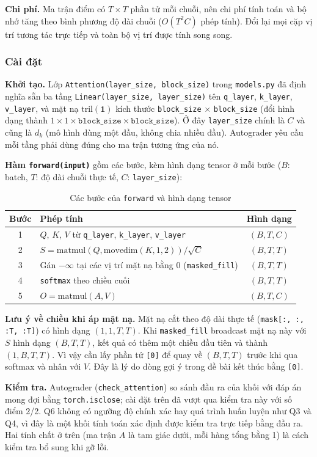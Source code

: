 \textbf{Chi phí.} Ma trận điểm có $T \times T$ phần tử mỗi chuỗi, nên chi phí tính
toán và bộ nhớ tăng theo bình phương độ dài chuỗi ($O(T^2 C)$ phép tính). Đổi lại
mọi cặp vị trí tương tác trực tiếp và toàn bộ vị trí được tính song song.

\subsubsection{Cài đặt}

\textbf{Khởi tạo.} Lớp \texttt{Attention(layer\_size, block\_size)} trong
\texttt{models.py} đã định nghĩa sẵn ba tầng \texttt{Linear(layer\_size,
layer\_size)} tên \texttt{q\_layer}, \texttt{k\_layer}, \texttt{v\_layer}, và mặt
nạ $\mathrm{tril}(\mathbf{1})$ kích thước \texttt{block\_size} $\times$
\texttt{block\_size} (đổi hình dạng thành $1 \times 1 \times \texttt{block\_size}
\times \texttt{block\_size}$). Ở đây \texttt{layer\_size} chính là $C$ và cũng
là $d_k$ (mô hình dùng một đầu, không chia nhiều đầu). Autograder yêu cầu mỗi
tầng phải dùng đúng cho ma trận tương ứng của nó.

\textbf{Hàm \texttt{forward(input)}} gồm các bước, kèm hình dạng tensor ở mỗi
bước ($B$: batch, $T$: độ dài chuỗi thực tế, $C$: \texttt{layer\_size}):
\begin{table}[htbp]
\caption{Các bước của \texttt{forward} và hình dạng tensor}
\label{tab:q6_shapes}
\centering
\begin{tabular}{clc}
\toprule
Bước & Phép tính & Hình dạng \\
\midrule
1 & $Q$, $K$, $V$ từ \texttt{q\_layer}, \texttt{k\_layer}, \texttt{v\_layer} & $(B, T, C)$ \\
2 & $S = \mathrm{matmul}(Q, \mathrm{movedim}(K, 1, 2)) / \sqrt{C}$ & $(B, T, T)$ \\
3 & Gán $-\infty$ tại các vị trí mặt nạ bằng 0 (\texttt{masked\_fill}) & $(B, T, T)$ \\
4 & \texttt{softmax} theo chiều cuối & $(B, T, T)$ \\
5 & $O = \mathrm{matmul}(A, V)$ & $(B, T, C)$ \\
\bottomrule
\end{tabular}
\end{table}

\textbf{Lưu ý về chiều khi áp mặt nạ.} Mặt nạ cắt theo độ dài thực tế
(\texttt{mask[:, :, :T, :T]}) có hình dạng $(1, 1, T, T)$. Khi \texttt{masked\_fill}
broadcast mặt nạ này với $S$ hình dạng $(B, T, T)$, kết quả có thêm một chiều đầu
tiên và thành $(1, B, T, T)$. Vì vậy cần lấy phần tử \texttt{[0]} để quay về
$(B, T, T)$ trước khi qua softmax và nhân với $V$. Đây là lý do dòng gợi ý trong
đề bài kết thúc bằng \texttt{[0]}.

\textbf{Kiểm tra.} Autograder (\texttt{check\_attention}) so sánh đầu ra của khối
với đáp án mong đợi bằng \texttt{torch.isclose}; cài đặt trên đã vượt qua kiểm
tra này với số điểm 2/2. Q6 không có ngưỡng độ chính xác hay quá trình huấn
luyện như Q3 và Q4, vì đây là một khối tính toán xác định được kiểm tra trực
tiếp bằng đầu ra. Hai tính chất ở trên (ma trận $A$ là tam giác dưới, mỗi hàng
tổng bằng 1) là cách kiểm tra bổ sung khi gỡ lỗi.